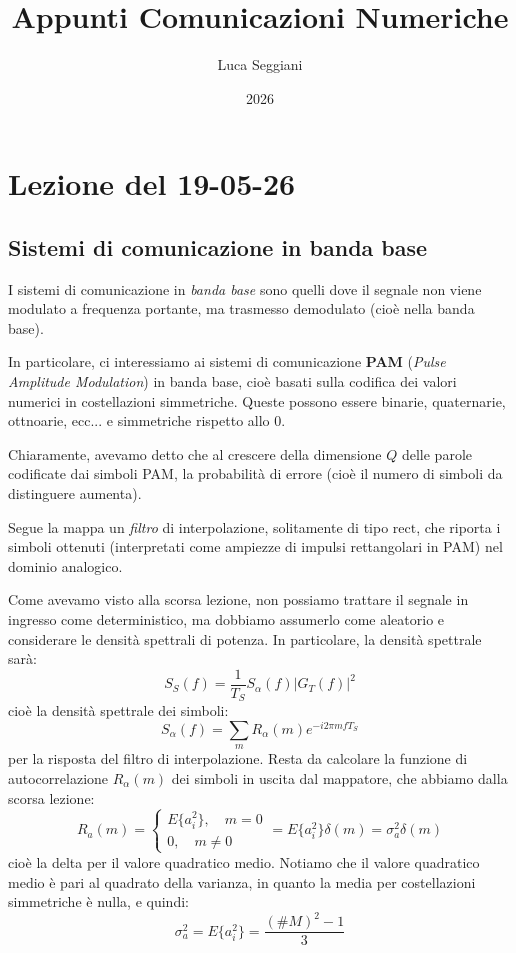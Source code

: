 \documentclass[a4paper,11pt]{article}
\title{Appunti Comunicazioni Numeriche}
\author{Luca Seggiani}
\date{2026}
\begin{document}
\section{Lezione del 19-05-26}

\thispagestyle{empty}
\pagestyle{fancy}

\subsection{Sistemi di comunicazione in banda base}
I sistemi di comunicazione in \textit{banda base} sono quelli dove il segnale non viene modulato a frequenza portante, ma trasmesso demodulato (cioè nella banda base).

In particolare, ci interessiamo ai sistemi di comunicazione \textbf{PAM} (\textit{Pulse Amplitude Modulation}) in banda base, cioè basati sulla codifica dei valori numerici in costellazioni simmetriche. Queste possono essere binarie, quaternarie, ottnoarie, ecc... e simmetriche rispetto allo 0.

Chiaramente, avevamo detto che al crescere della dimensione $Q$ delle parole codificate dai simboli PAM, la probabilità di errore (cioè il numero di simboli da distinguere aumenta). 

Segue la mappa un \textit{filtro} di interpolazione, solitamente di tipo $\mathrm{rect}$, che riporta i simboli ottenuti (interpretati come ampiezze di impulsi rettangolari in PAM) nel dominio analogico.

\par\smallskip

Come avevamo visto alla scorsa lezione, non possiamo trattare il segnale in ingresso come deterministico, ma dobbiamo assumerlo come aleatorio e considerare le densità spettrali di potenza. In particolare, la densità spettrale sarà:
$$
S_S(f) = \frac{1}{T_S} S_\alpha(f) | G_T(f) |^2
$$
cioè la densità spettrale dei simboli:
$$
S_\alpha(f) = \sum_m R_\alpha(m) e^{-i 2 \pi m f T_S}
$$
per la risposta del filtro di interpolazione. Resta da calcolare la funzione di autocorrelazione $R_\alpha(m)$ dei simboli in uscita dal mappatore, che abbiamo dalla scorsa lezione:
$$
R_a(m) =
\begin{cases}
	E\{a_i^2\}, \quad m = 0 \\
	0, \quad m \neq 0
\end{cases}
= E \{ a_i^2 \} \delta(m) = \sigma_a^2 \delta(m)
$$
cioè la delta per il valore quadratico medio. Notiamo che il valore quadratico medio è pari al quadrato della varianza, in quanto la media per costellazioni simmetriche è nulla, e quindi:
$$
\sigma_a^2 = E \{ a_i^2 \} = \frac{(\# M)^2 - 1}{3}
$$
\end{document}
